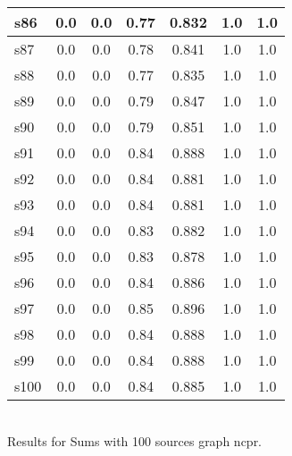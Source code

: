 \documentclass{article}
\begin{document}
\begin{tabular}{|l|c|c|c|c|c|c|}
\hline
s86 &0.0 & 0.0 & 0.77 & 0.832 & 1.0 & 1.0\\
\hline
s87 &0.0 & 0.0 & 0.78 & 0.841 & 1.0 & 1.0\\
\hline
s88 &0.0 & 0.0 & 0.77 & 0.835 & 1.0 & 1.0\\
\hline
s89 &0.0 & 0.0 & 0.79 & 0.847 & 1.0 & 1.0\\
\hline
s90 &0.0 & 0.0 & 0.79 & 0.851 & 1.0 & 1.0\\
\hline
s91 &0.0 & 0.0 & 0.84 & 0.888 & 1.0 & 1.0\\
\hline
s92 &0.0 & 0.0 & 0.84 & 0.881 & 1.0 & 1.0\\
\hline
s93 &0.0 & 0.0 & 0.84 & 0.881 & 1.0 & 1.0\\
\hline
s94 &0.0 & 0.0 & 0.83 & 0.882 & 1.0 & 1.0\\
\hline
s95 &0.0 & 0.0 & 0.83 & 0.878 & 1.0 & 1.0\\
\hline
s96 &0.0 & 0.0 & 0.84 & 0.886 & 1.0 & 1.0\\
\hline
s97 &0.0 & 0.0 & 0.85 & 0.896 & 1.0 & 1.0\\
\hline
s98 &0.0 & 0.0 & 0.84 & 0.888 & 1.0 & 1.0\\
\hline
s99 &0.0 & 0.0 & 0.84 & 0.888 & 1.0 & 1.0\\
\hline
s100 &0.0 & 0.0 & 0.84 & 0.885 & 1.0 & 1.0\\
\hline
\end{tabular}\\

\noindent Results for Sums with 100 sources graph ncpr.
\end{document}

